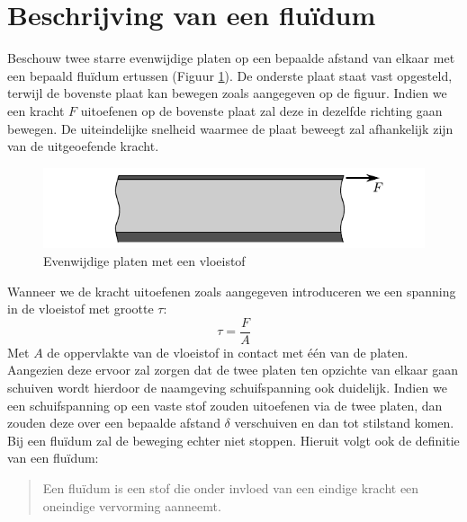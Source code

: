 	\section{Beschrijving van een fluïdum}
	\label{sec:Beschrijving van een fluidum}
Beschouw twee starre evenwijdige platen op een bepaalde afstand van elkaar met een bepaald fluïdum ertussen (Figuur \ref{fig:Evenwijdige platen}). De onderste plaat staat vast opgesteld, terwijl de bovenste plaat kan bewegen zoals aangegeven op de figuur. Indien we een kracht $F$ uitoefenen op de bovenste plaat zal deze in dezelfde richting gaan bewegen. De uiteindelijke snelheid waarmee de plaat beweegt zal afhankelijk zijn van de uitgeoefende kracht.
\begin{figure}[htb]
	\centering
	\includegraphics{fig/basisbegrippen/Viscositeit_platen}
	\caption{Evenwijdige platen met een vloeistof }
	\label{fig:Evenwijdige platen}
\end{figure}
Wanneer we de kracht uitoefenen zoals aangegeven introduceren we een spanning in de vloeistof met grootte $\tau$:
\begin{equation}
	\tau = \frac{F}{A}
\end{equation}
Met $A$ de oppervlakte van de vloeistof in contact met één van de platen. Aangezien deze ervoor zal zorgen dat de twee platen ten opzichte van elkaar gaan schuiven wordt hierdoor de naamgeving schuifspanning ook duidelijk. Indien we een schuifspanning op een vaste stof zouden uitoefenen via de twee platen, dan zouden deze over een bepaalde afstand $\delta$ verschuiven en dan tot stilstand komen. Bij een fluïdum zal de beweging echter niet stoppen. Hieruit volgt ook de definitie van een fluïdum:

\begin{quotation}
	Een fluïdum is een stof die onder invloed van een eindige kracht een oneindige vervorming aanneemt.
\end{quotation}

